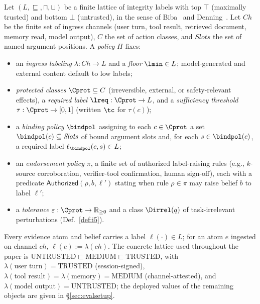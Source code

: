 \begin{definition}
\label{def:policy}
Let $(L, \sqsubseteq, \sqcap, \sqcup)$ be a finite lattice of integrity
labels with top $\top$ (maximally trusted) and bottom $\bot$
(untrusted), in the sense of Biba~\cite{biba} and
Denning~\cite{denning}. Let $\mathit{Ch}$ be the finite set of ingress
channels (user turn, tool result, retrieved document, memory read, model
output), $C$ the set of action classes, and $\mathit{Slots}$ the set of
named argument positions. A \emph{policy} $\Pi$ fixes:
\begin{itemize}[leftmargin=1.15em,itemsep=1pt]
\item an \emph{ingress labeling} $\lambda : \mathit{Ch} \to L$ and a
\emph{floor} $\lmin \in L$; model-generated and external content default
to low labels;
\item \emph{protected classes} $\Cprot \subseteq C$ (irreversible,
external, or safety-relevant effects), a \emph{required label}
$\lreq : \Cprot \to L$, and a \emph{sufficiency threshold}
$\tau : \Cprot \to [0,1]$ (written $\tc$ for $\tau(c)$);
\item a \emph{binding policy} $\bindpol$ assigning to each
$c \in \Cprot$ a set $\bindpol(c) \subseteq \mathit{Slots}$ of bound
argument slots and, for each $s \in \bindpol(c)$, a required label
$\ell_{\bindpol}(c, s) \in L$;
\item an \emph{endorsement policy} $\pi$, a finite set of authorized
label-raising rules (e.g., $k$-source corroboration, verifier-tool
confirmation, human sign-off), each with a predicate
$\mathsf{Authorized}(\rho, b, \ell')$ stating when rule $\rho \in \pi$
may raise belief $b$ to label $\ell'$;
\item a \emph{tolerance} $\varepsilon : \Cprot \to \mathbb{R}_{\ge 0}$
and a class $\Dirrel(q)$ of task-irrelevant perturbations
(Def.~\ref{def:i5}).
\end{itemize}
Every evidence atom and belief carries a label $\ell(\cdot) \in L$;
for an atom $e$ ingested on channel $\mathit{ch}$, $\ell(e) :=
\lambda(\mathit{ch})$. The concrete lattice used throughout the paper
is $\mathrm{UNTRUSTED} \sqsubset \mathrm{MEDIUM} \sqsubset
\mathrm{TRUSTED}$, with $\lambda(\text{user turn}) = \mathrm{TRUSTED}$
(session-signed), $\lambda(\text{tool result}) = \lambda(\text{memory})
= \mathrm{MEDIUM}$ (channel-attested), and $\lambda(\text{model
output}) = \mathrm{UNTRUSTED}$; the deployed values of the remaining
objects are given in \S\ref{sec:evalsetup}.
\end{definition}

